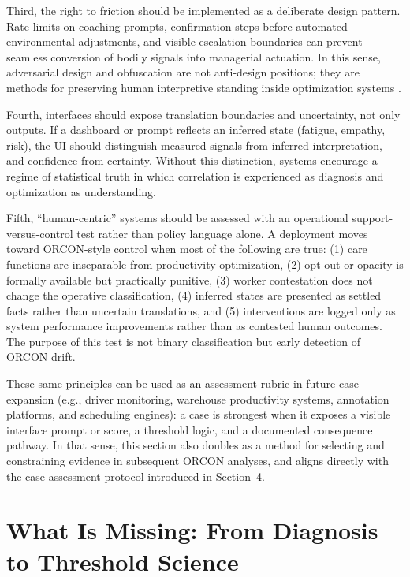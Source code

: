 \documentclass[runningheads]{llncs}
\begin{document}
Third, the right to friction should be implemented as a deliberate design pattern. Rate limits on coaching prompts, confirmation steps before automated environmental adjustments, and visible escalation boundaries can prevent seamless conversion of bodily signals into managerial actuation. In this sense, adversarial design and obfuscation are not anti-design positions; they are methods for preserving human interpretive standing inside optimization systems \cite{disalvo2012adversarial,nissenbaum2015obfuscation}.

Fourth, interfaces should expose translation boundaries and uncertainty, not only outputs. If a dashboard or prompt reflects an inferred state (fatigue, empathy, risk), the UI should distinguish measured signals from inferred interpretation, and confidence from certainty. Without this distinction, systems encourage a regime of statistical truth in which correlation is experienced as diagnosis and optimization as understanding.

Fifth, ``human-centric'' systems should be assessed with an operational support-versus-control test rather than policy language alone. A deployment moves toward ORCON-style control when most of the following are true: (1) care functions are inseparable from productivity optimization, (2) opt-out or opacity is formally available but practically punitive, (3) worker contestation does not change the operative classification, (4) inferred states are presented as settled facts rather than uncertain translations, and (5) interventions are logged only as system performance improvements rather than as contested human outcomes. The purpose of this test is not binary classification but early detection of ORCON drift.

These same principles can be used as an assessment rubric in future case expansion (e.g., driver monitoring, warehouse productivity systems, annotation platforms, and scheduling engines): a case is strongest when it exposes a visible interface prompt or score, a threshold logic, and a documented consequence pathway. In that sense, this section also doubles as a method for selecting and constraining evidence in subsequent ORCON analyses, and aligns directly with the case-assessment protocol introduced in Section~4.

\section{What Is Missing: From Diagnosis to Threshold Science}
\end{document}
